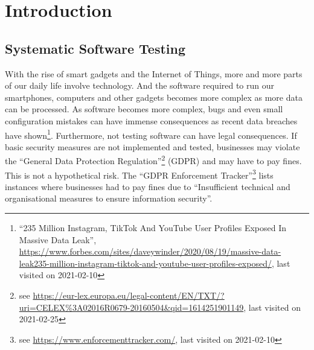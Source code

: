 \chapter{Introduction}\label{sec:introduction}


\section{Systematic Software Testing}\label{sec:introduction_software_testing}

With the rise of smart gadgets and the Internet of Things, more and more parts of our daily life involve technology.
And the software required to run our smartphones, computers and other gadgets  becomes more complex as more data can be processed.
As software becomes more complex, bugs and even small configuration mistakes can have immense consequences as recent data breaches have shown\footnote{\enquote{235 Million Instagram, TikTok And YouTube User Profiles Exposed In Massive Data Leak}, \url{https://www.forbes.com/sites/daveywinder/2020/08/19/massive-data-leak235-million-instagram-tiktok-and-youtube-user-profiles-exposed/}, last visited on 2021-02-10}.
Furthermore, not testing software can have legal consequences.
If basic security measures are not implemented and tested, businesses may violate the \enquote{General Data Protection Regulation}\footnote{see \url{https://eur-lex.europa.eu/legal-content/EN/TXT/?uri=CELEX\%3A02016R0679-20160504&qid=1614251901149}, last visited on 2021-02-25}
(GDPR) and may have to pay fines.
This is not a hypothetical risk.
The \enquote{GDPR Enforcement Tracker}\footnote{see \url{https://www.enforcementtracker.com/}, last visited on 2021-02-10} lists instances where businesses had to pay fines due to \enquote{Insufficient technical and organisational measures to ensure information security}.


